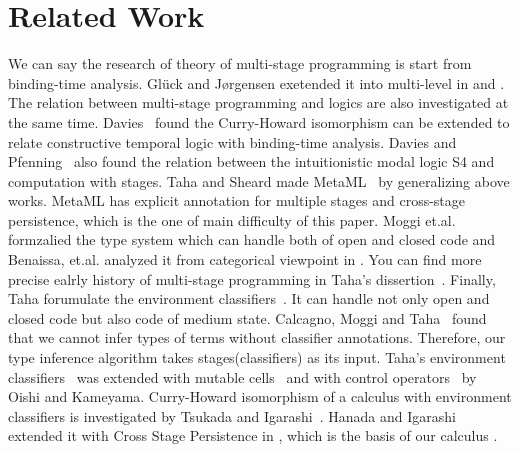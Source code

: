 
\section{Related Work}
\label{sec:related-work}



We can say the research of theory of multi-stage programming is start from
binding-time analysis\cite{Nielson1992TwoLevel}. Gl{\"u}ck and J{\o}rgensen
exetended it into multi-level in \cite{GluckJorgensen1995Efficient} and
\cite{GluckJorgensen1996Fast}. The relation between multi-stage programming and
logics are also investigated at the same time. Davies~\cite{davis1996temporal}
found the Curry-Howard isomorphism can be extended to relate constructive
temporal logic with binding-time analysis. Davies and
Pfenning~\cite{DaviesPfenning1996Modal} also found the relation between the
intuitionistic modal logic S4 and computation with stages. Taha and Sheard made
MetaML~\cite{TahaSheard1997MetaML} by generalizing above works. MetaML has
explicit annotation for multiple stages and cross-stage persistence, which is
the one of main difficulty of this paper. Moggi
et.al.~\cite{MoggiTahaBenaissaSheard99ESOP} formzalied the type system which
can handle both of open and closed code and Benaissa, et.al. analyzed it from
categorical viewpoint in \cite{BenaissaMoggiTahaSheard1999Logical}. You can
find more precise ealrly history of multi-stage programming in Taha's
dissertion~\cite{Taha1999Multi}. Finally, Taha forumulate the environment
classifiers~\cite{TahaNielsen2003Environment}. It can handle not only open and
closed code but also code of medium state. Calcagno, Moggi and
Taha~\cite{CalcagnoMoggiTaha2004InferenceClassifiers} found that we cannot
infer types of terms without classifier annotations. Therefore, our type
inference algorithm takes stages(classifiers) as its input. Taha's environment
classifiers~\cite{TahaNielsen2003Environment} was extended with mutable
cells~\cite{KiselyovKameyamaSudo2016Refined} and with control
operators~\cite{OishiKameyama2017ControlOperators} by Oishi and Kameyama.
Curry-Howard isomorphism of a calculus with environment classifiers is
investigated by Tsukada and Igarashi~\cite{TsukadaIgarashi2010Logical}. Hanada
and Igarashi extended it with Cross Stage Persistence in
\cite{HanadaIgarashi2014CSP}, which is the basis of our calculus \LMD.


